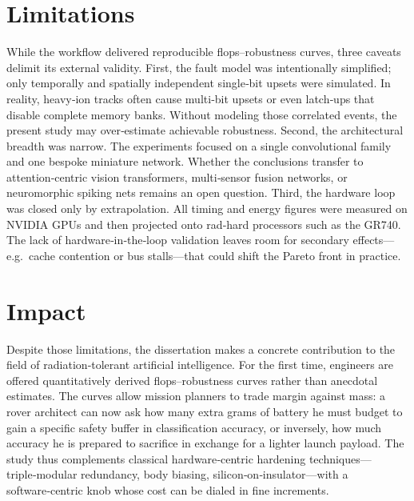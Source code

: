 \section{Limitations}
While the workflow delivered reproducible \gls{flops}–robustness curves, three caveats delimit its external validity. 
First, the fault model was intentionally simplified; only temporally and spatially independent single‑bit upsets were simulated. In reality, heavy‑ion tracks often cause multi‑bit upsets or even latch‑ups that disable complete memory banks. Without modeling those correlated events, the present study may over‑estimate achievable robustness. 
Second, the architectural breadth was narrow. The experiments focused on a single convolutional family and one bespoke miniature network. Whether the conclusions transfer to attention‑centric vision transformers, multi‑sensor fusion networks, or neuromorphic spiking nets remains an open question. 
Third, the hardware loop was closed only by extrapolation. All timing and energy figures were measured on NVIDIA GPUs and then projected onto rad‑hard processors such as the GR740. The lack of hardware‑in‑the‑loop validation leaves room for secondary effects—e.g.\ cache contention or bus stalls—that could shift the Pareto front in practice.










\section{Impact}
Despite those limitations, the dissertation makes a concrete contribution to the field of radiation‑tolerant artificial intelligence. For the first time, engineers are offered quantitatively derived \gls{flops}–robustness curves rather than anecdotal estimates. The curves allow mission planners to trade margin against mass: a rover architect can now ask how many extra grams of battery he must budget to gain a specific safety buffer in classification accuracy, or inversely, how much accuracy he is prepared to sacrifice in exchange for a lighter launch payload. The study thus complements classical hardware‑centric hardening techniques—triple‑modular redundancy, body biasing, silicon‑on‑insulator—with a software‑centric knob whose cost can be dialed in fine increments.










